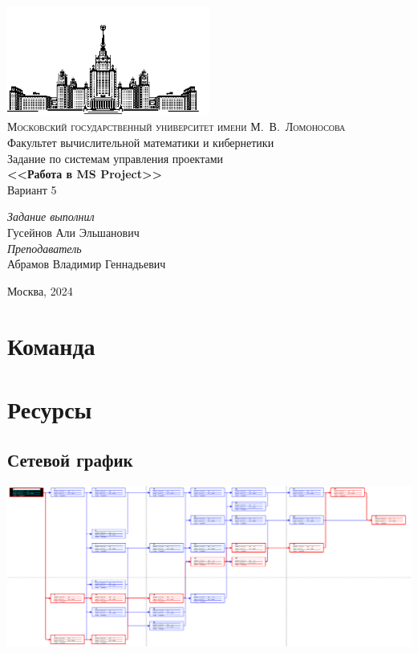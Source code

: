 \documentclass[14pt]{article}
\begin{document}
\thispagestyle{empty}
\begin{center}
	\ \vspace{-4cm}\\
	\includegraphics[width=0.5\textwidth]{../img/msu.png}\\
	{\scshape Московский государственный университет имени М.~В.~Ломоносова}\\
	Факультет вычислительной  математики и кибернетики\\
	\vfill
	{\LARGE Задание по системам управления проектами}\\
	\vspace{1cm}
	{\Huge\bfseries <<Работа в MS Project>>}\\
	{\Huge Вариант 5} 
\end{center}
\vspace{1cm}
\begin{flushright}
	\large
	\textit{Задание выполнил}\\
	Гусейнов Али Эльшанович\\
	\vspace{5mm}
	\textit{Преподаватель}\\
	Абрамов Владимир Геннадьевич
\end{flushright}
\vfill
\begin{center}
	Москва, 2024
\end{center}
\clearpage
\tableofcontents
\clearpage
\section{Команда}
\section{Ресурсы}
	\subsection{Сетевой график}
	\includegraphics[width=\textwidth]{../img/init_network_graph.png}
\end{document}
